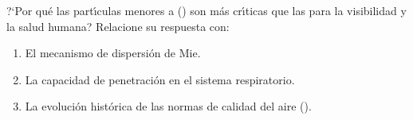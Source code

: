 \begin{bloque_ejercicios}
\begin{ejercicios}
\item ?`Por qu\'e las part\'{\i}culas menores a () son m\'as cr\'{\i}ticas que las  para la visibilidad y la salud humana? Relacione su respuesta con:
\begin{enumerate}[label=\alph*)]
    \item El mecanismo de dispersi\'on de Mie.
    \item La capacidad de penetraci\'on en el sistema respiratorio.
    \item La evoluci\'on hist\'orica de las normas de calidad del aire (). 
\end{enumerate}

\end{ejercicios}
\end{bloque_ejercicios}


